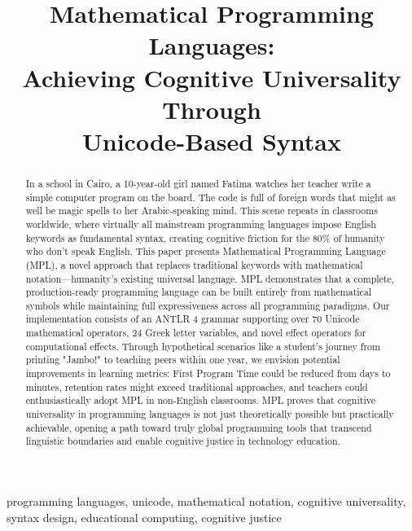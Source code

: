 \documentclass[10pt,conference]{IEEEtran}
\begin{document}
\title{Mathematical Programming Languages:\\
Achieving Cognitive Universality Through\\
Unicode-Based Syntax}

\author{
}

\maketitle

\begin{abstract}
In a school in Cairo, a 10-year-old girl named Fatima watches her teacher write a simple computer program on the board. The code is full of foreign words that might as well be magic spells to her Arabic-speaking mind. This scene repeats in classrooms worldwide, where virtually all mainstream programming languages impose English keywords as fundamental syntax, creating cognitive friction for the 80\% of humanity who don't speak English. This paper presents Mathematical Programming Language (MPL), a novel approach that replaces traditional keywords with mathematical notation—humanity's existing universal language. MPL demonstrates that a complete, production-ready programming language can be built entirely from mathematical symbols while maintaining full expressiveness across all programming paradigms. Our implementation consists of an ANTLR 4 grammar supporting over 70 Unicode mathematical operators, 24 Greek letter variables, and novel effect operators for computational effects. Through hypothetical scenarios like a student's journey from printing "Jambo!" to teaching peers within one year, we envision potential improvements in learning metrics: First Program Time could be reduced from days to minutes, retention rates might exceed traditional approaches, and teachers could enthusiastically adopt MPL in non-English classrooms. MPL proves that cognitive universality in programming languages is not just theoretically possible but practically achievable, opening a path toward truly global programming tools that transcend linguistic boundaries and enable cognitive justice in technology education.
\end{abstract}

\begin{IEEEkeywords}
programming languages, unicode, mathematical notation, cognitive universality, syntax design, educational computing, cognitive justice
\end{IEEEkeywords}
\end{document}
